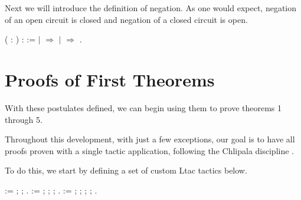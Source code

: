 \documentclass[11pt,twocolumn]{article}
\begin{document}
Next we will introduce the definition of negation.  As one would
expect, negation of an open circuit is closed and negation of a closed
circuit is open.


\begin{coqdoccode}
\coqdocemptyline
\coqdocnoindent
{}  ( : ) :  :=\coqdoceol
\coqdocindent{1.00em}
  \coqdoceol
\coqdocindent{1.00em}
\ensuremath{|}  \ensuremath{\Rightarrow} \coqdoceol
\coqdocindent{1.00em}
\ensuremath{|}  \ensuremath{\Rightarrow} \coqdoceol
\coqdocindent{1.00em}
.\coqdoceol
\coqdocemptyline
\end{coqdoccode}
\section{Proofs of First Theorems}




With these postulates defined, we can begin using them to prove
theorems 1 through 5.


Throughout this development, with just a few exceptions, our goal is
to have all proofs proven with a single tactic application, following
the Chlipala discipline \cite{chlipala13a}.


To do this, we start by defining a set of custom Ltac tactics below.


\begin{coqdoccode}
\coqdocemptyline
\coqdocnoindent
{}   :=\coqdoceol
\coqdocindent{1.00em}
  ;\coqdoceol
\coqdocindent{1.00em}
;\coqdoceol
\coqdocindent{1.00em}
.\coqdoceol
\coqdocemptyline
\coqdocnoindent
{}    :=\coqdoceol
\coqdocindent{1.00em}
  ;\coqdoceol
\coqdocindent{1.00em}
  ;\coqdoceol
\coqdocindent{1.00em}
;\coqdoceol
\coqdocindent{1.00em}
.\coqdoceol
\coqdocemptyline
\coqdocnoindent
{}     :=\coqdoceol
\coqdocindent{1.00em}
  ;\coqdoceol
\coqdocindent{1.00em}
  ;\coqdoceol
\coqdocindent{1.00em}
  ;\coqdoceol
\coqdocindent{1.00em}
;\coqdoceol
\coqdocindent{1.00em}
.\coqdoceol
\coqdocemptyline
\end{coqdoccode}
\end{document}
